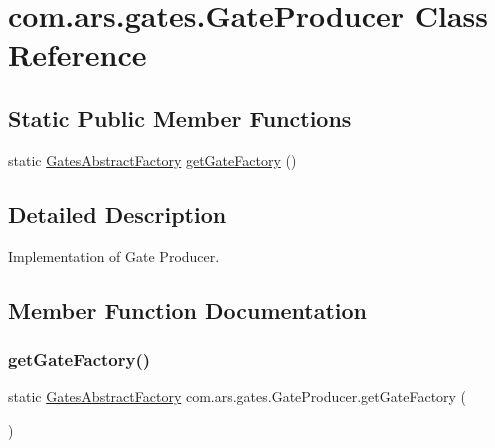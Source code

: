 \hypertarget{classcom_1_1ars_1_1gates_1_1_gate_producer}{}\section{com.\+ars.\+gates.\+Gate\+Producer Class Reference}
\label{classcom_1_1ars_1_1gates_1_1_gate_producer}
\subsection*{Static Public Member Functions}
\begin{DoxyCompactItemize}
\item 
static \hyperlink{classcom_1_1ars_1_1gates_1_1_gates_abstract_factory}{Gates\+Abstract\+Factory} \hyperlink{classcom_1_1ars_1_1gates_1_1_gate_producer_a643829e30db1500430781afb9bc825e9}{get\+Gate\+Factory} ()
\end{DoxyCompactItemize}


\subsection{Detailed Description}
Implementation of Gate Producer. 

\subsection{Member Function Documentation}
\hypertarget{classcom_1_1ars_1_1gates_1_1_gate_producer_a643829e30db1500430781afb9bc825e9}{}\label{classcom_1_1ars_1_1gates_1_1_gate_producer_a643829e30db1500430781afb9bc825e9} 
\subsubsection{\texorpdfstring{get\+Gate\+Factory()}{getGateFactory()}}
{\footnotesize\ttfamily static \hyperlink{classcom_1_1ars_1_1gates_1_1_gates_abstract_factory}{Gates\+Abstract\+Factory} com.\+ars.\+gates.\+Gate\+Producer.\+get\+Gate\+Factory (\begin{DoxyParamCaption}{ }\end{DoxyParamCaption})\hspace{0.3cm}{\ttfamily [static]}}

